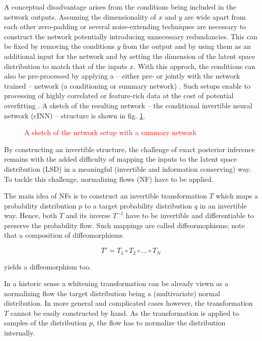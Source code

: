 A conceptual disadvantage arises from the conditions being included in the network outputs. Assuming the dimensionality of $x$ and $y$ are wide apart from each other zero-padding or several noise-extending techniques are necessary to construct the network potentially introducing unnecessary redundancies. This can be fixed by removing the conditions $y$ from the output and by using them as an additional input for the network and by setting the dimension of the latent space distribution to match that of the inputs $x$. With this approch, the conditions can also be pre-processed by applying a -- either pre- or jointly with the network trained -- network (a conditioning or summary network) \cite{BayesFlow}. Such setups enable to processing of highly correlated or feature-rich data at the cost of potential overfitting \cite{Ksoll_2020}. A sketch of the resulting network -- the conditional invertible neural network (cINN) -- structure is shown in fig. \ref{fig:cINN_archicture}.

\begin{figure}
	\caption{\textcolor{red}{A sketch of the network setup with a summary network}}
	\label{fig:cINN_archicture}
\end{figure}

By constructing an invertible structure, the challenge of exact posterior inference remains with the added difficulty of mapping the inputs to the latent space distribution (LSD) in a meaningful (invertible and information conserving) way. To tackle this challenge, normalizing flows (NF) have to be applied.


The main idea of NFs is to construct an invertible transformation $T$ which maps a probability distribution $p$ to a target probability distribution $q$ in an invertible way. Hence, both $T$ and its inverse $T^{-1}$ have to be invertible and differentiable to preserve the probability flow. Such mappings are called diffeormophisms; note that a composition of diffeomorphisms

\begin{equation*}
	T' = T_1 \circ T_2 \circ ... \circ T_N
\end{equation*}

yields a diffeomorphism too.

In a historic sense a whitening transformation can be already viewn as a normalizing flow the target distribution being a (multivariate) normal distribution. In more general and complicated cases however, the transformation $T$ cannot be easily constructed by hand. As the transformation is applied to samples of the distribution $p$, the flow has to normalize the distribution internally.

